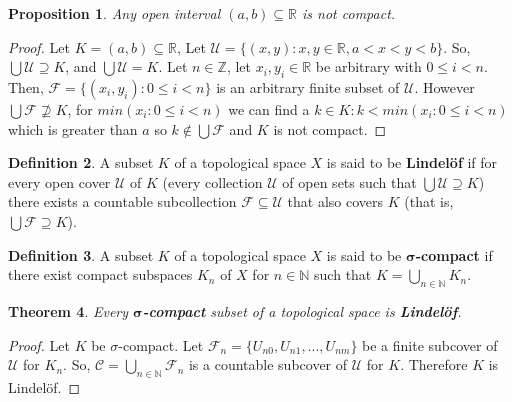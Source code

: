 \documentclass{amsart}
\theoremstyle{plain}
\newtheorem{theorem}{Theorem}
\newtheorem{proposition}[theorem]{Proposition}
\theoremstyle{definition}
\newtheorem{definition}[theorem]{Definition}
\theoremstyle{remark}
\begin{document}
	\begin{proposition}
	  Any open interval \((a,b)\subseteq\mathbb R\) is not compact.
	\end{proposition}
	\begin{proof}
	Let $K = (a, b) \subseteq \mathbb{R}$, Let $\mathcal{U} = \lbrace (x, y) : x, y \in \mathbb{R}, a < x < y < b \rbrace$. So, $\bigcup \mathcal{U} \supseteq K$, and $\bigcup \mathcal{U} = K$. Let $n \in \mathbb{Z}$, let $x_i, y_i \in \mathbb{R}$ be arbitrary with $0 \leq i < n$. Then, $\mathcal{F} = \lbrace (x_i, y_i) : 0 \leq i < n \rbrace$ is an arbitrary finite subset of $\mathcal{U}$. However $\bigcup \mathcal{F} \not\supseteq K$, for $min(x_i : 0 \leq i < n)$ we can find a $k \in K : k < min(x_i : 0 \leq i < n)$ which is greater than $a$ so $k \not\in \bigcup \mathcal{F}$ and $K$ is not compact.
	\end{proof}

	\begin{definition}
	  A subset \(K\) of a topological space \(X\) is said to be \textbf{Lindel\"of} if for every
	  open cover \(\mathcal U\) of \(K\) (every collection \(\mathcal U\) of open sets
	  such that \(\bigcup \mathcal U\supseteq K\)) there exists a countable subcollection
	  \(\mathcal F\subseteq \mathcal U\) that also covers \(K\) (that is,
	  \(\bigcup\mathcal F\supseteq K\)). \cite{Clontz2015}
	\end{definition}

	\begin{definition}
	  A subset \(K\) of a topological space \(X\) is said to be \textbf{\(\boldsymbol{\sigma}\)-compact} if
	  there exist compact subspaces \(K_n\) of \(X\) for \(n\in\mathbb N\) such that
	  \(K=\bigcup_{n\in\mathbb N} K_n\). \cite{Clontz2015}
	  \newline \newline
	\end{definition}
	\begin{theorem}
		Every \(\boldsymbol{\sigma}\)\textbf{-compact} subset of a topological space is \textbf{Lindel\"of}.
	\end{theorem}
	\begin{proof}
	Let $K$ be \(\sigma\)-compact. Let $\mathcal{F}_n = \lbrace U_{n0}, U_{n1}, ..., U_{nm} \rbrace$ be a finite subcover of $\mathcal{U}$ for $K_n$. So, $\mathcal{C} = \bigcup_{n \in \mathbb{N}} \mathcal{F}_n$ is a countable subcover of $\mathcal{U}$ for $K$. Therefore $K$ is Lindel\"of.
	
	\end{proof}
\end{document}
